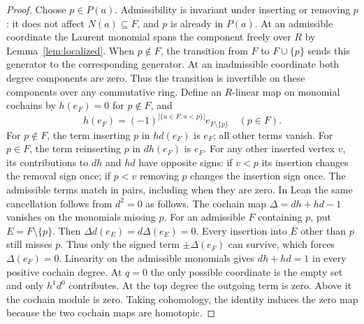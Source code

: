 \begin{proof}
\leanok
Choose $p\in P(a)$. Admissibility is invariant under inserting or removing
$p$: it does not affect $N(a)\subseteq F$, and $p$ is already in $P(a)$.
At an admissible coordinate the Laurent monomial spans the component
freely over $R$ by Lemma~\ref{lem:localized}. When $p\notin F$,
the transition from $F$ to $F\cup\{p\}$ sends this generator to the
corresponding generator. At an inadmissible coordinate both degree
components are zero. Thus the transition is invertible on these
components over any commutative ring. Define an $R$-linear map on
monomial cochains by $h(e_F)=0$ for $p\notin F$, and
\[
 h(e_F)=(-1)^{|\{u\in F:u<p\}|}e_{F\setminus\{p\}}
 \quad(p\in F).
\]
For $p\notin F$, the term inserting $p$ in $h d(e_F)$ is $e_F$;
all other terms vanish. For $p\in F$, the term reinserting $p$ in
$d h(e_F)$ is $e_F$. For any other inserted vertex $v$, its contributions
to $dh$ and $hd$ have opposite signs: if $v<p$ its insertion changes
the removal sign once; if $p<v$ removing $p$ changes the insertion sign
once. The admissible terms match in pairs, including when they are zero.
In Lean the same cancellation follows from $d^2=0$ as follows.
The cochain map $\Delta=dh+hd-1$ vanishes on the monomials missing $p$.
For an admissible $F$ containing $p$, put $E=F\setminus\{p\}$.
Then $\Delta d(e_E)=d\Delta(e_E)=0$. Every insertion into $E$ other
than $p$ still misses $p$. Thus only the signed term $\pm\Delta(e_F)$
can survive, which forces $\Delta(e_F)=0$. Linearity on the admissible
monomials gives $dh+hd=1$ in every positive cochain degree. At $q=0$ the
only possible coordinate is the empty set and only $h^1d^0$ contributes.
At the top degree the outgoing term is zero. Above it the cochain
module is zero. Taking cohomology, the identity induces the zero map
because the two cochain maps are homotopic.
\end{proof}

